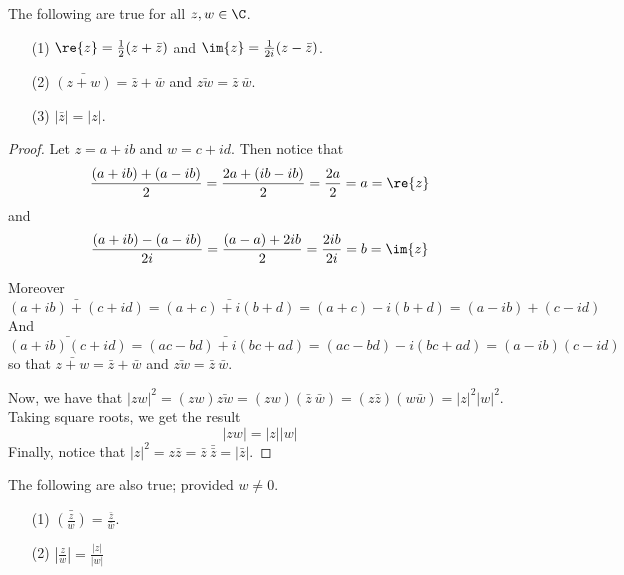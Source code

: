 \begin{lemma}\label{1.1.3}
    The following are true for all $z,w \in \C$.
    \begin{enumerate}
        \item[(1)] $\re{z}=\frac{1}{2}(z+\bar{z})$ and
            $\im{z}=\frac{1}{2i}(z-\bar{z})$.

        \item[(2)] $\bar{(z+w)}=\bar{z}+\bar{w}$ and $\bar{zw}=\bar{z} \
            \bar{w}$.

        \item[(3)] $|\bar{z}|=|z|$.
    \end{enumerate}
\end{lemma}
\begin{proof}
    Let $z=a+ib$ and  $w=c+id$. Then notice that
    \begin{equation*}
        \frac{(a+ib)+(a-ib)}{2}=\frac{2a+(ib-ib)}{2}=\frac{2a}{2}=a=\re{z}
    \end{equation*}
    and
    \begin{equation*}
        \frac{(a+ib)-(a-ib)}{2i}=\frac{(a-a)+2ib}{2}=\frac{2ib}{2i}=b=\im{z}
    \end{equation*}

    Moreover
    \begin{equation*}
        \bar{(a+ib)+(c+id)}=\bar{(a+c)+i(b+d)}=(a+c)-i(b+d)=(a-ib)+(c-id)
    \end{equation*}
    And
    \begin{equation*}
        \bar{(a+ib)(c+id)}=\bar{(ac-bd)+i(bc+ad)}=(ac-bd)-i(bc+ad)=(a-ib)(c-id)
    \end{equation*}
    so that $\bar{z+w}=\bar{z}+\bar{w}$ and $\bar{zw}=\bar{z} \ \bar{w}$.

    Now, we have that $|zw|^2=(zw)\bar{zw}=(zw)(\bar{z} \
    \bar{w})=(z\bar{z})(w\bar{w})=|z|^2|w|^2$. Taking square roots, we get
    the result
    \begin{equation*}
        |zw|=|z||w|
    \end{equation*}
    Finally, notice that $|z|^2=z\bar{z}=\bar{z} \ \bar{\bar{z}}=|\bar{z}|$.
\end{proof}
\begin{corollary}
    The following are also true; provided $w \neq 0$.
    \begin{enumerate}
        \item[(1)] $\bar{(\frac{z}{w})}=\frac{\bar{z}}{\bar{w}}$.

        \item[(2)] $|\frac{z}{w}|=\frac{|z|}{|w|}$
    \end{enumerate}
\end{corollary}
